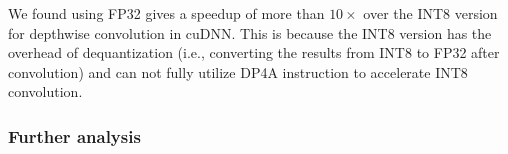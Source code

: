 
 We found using FP32 gives a speedup of more than $10\times$ over the INT8 version for depthwise convolution
in cuDNN. This is because the INT8 version has the overhead of dequantization (i.e., converting the results from INT8 to FP32 after
convolution) and can not fully utilize DP4A instruction to accelerate INT8 convolution. 


\subsubsection{Further analysis\label{sec:dwfurther}}


